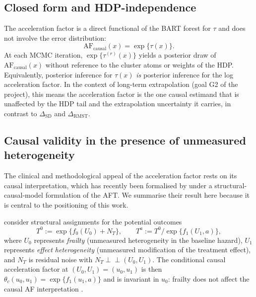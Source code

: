 \documentclass[11pt]{article}
\theoremstyle{plain}
\theoremstyle{definition}
\theoremstyle{remark}
\newcommand{\1}{\mathds{1}}
\newcommand{\tauf}{\tau}
\newcommand{\RMST}{\mathrm{RMST}}
\newcommand{\SD}{\mathrm{SD}}
\newcommand{\AF}{\mathrm{AF}}
\begin{document}
\subsection{Closed form and HDP-independence}

The acceleration factor is a direct functional of the BART forest for
$\tauf$ and does not involve the error distribution:
\begin{equation}
  \boxed{\;\AF_{\mathrm{causal}}(x) = \exp\{\tauf(x)\}.\;}
\end{equation}
At each MCMC iteration, $\exp\{\tauf^{(r)}(x)\}$ yields a posterior draw of
$\AF_{\mathrm{causal}}(x)$ without reference to the cluster atoms or
weights of the HDP. Equivalently, posterior inference for $\tauf(x)$
\emph{is} posterior inference for the log acceleration factor. In the
context of long-term extrapolation (goal G2 of the project), this means
the acceleration factor is the one causal estimand that is unaffected by
the HDP tail and the extrapolation uncertainty it carries, in contrast to
$\Delta_{\SD}$ and $\Delta_{\RMST}$.

\subsection{Causal validity in the presence of unmeasured heterogeneity}
\label{subsec:af-causal-validity}

The clinical and methodological appeal of the acceleration factor rests on
its causal interpretation, which has recently been formalised by
\citet{Brathovde2024} under a structural-causal-model formulation of the
AFT. We summarise their result here because it is central to the
positioning of this work.

\citet{Brathovde2024} consider structural assignments for the potential
outcomes
\begin{equation}
  T^{0} := \exp\{f_{0}(U_{0}) + N_{T}\}, \qquad
  T^{a} := T^{0}/\exp\{f_{1}(U_{1}, a)\},
  \label{eq:scm}
\end{equation}
where $U_{0}$ represents \emph{frailty} (unmeasured heterogeneity in the
baseline hazard), $U_{1}$ represents \emph{effect heterogeneity}
(unmeasured modification of the treatment effect), and $N_{T}$ is residual
noise with $N_{T} \perp\!\!\!\perp (U_{0}, U_{1})$. The conditional causal
acceleration factor at $(U_{0}, U_{1}) = (u_{0}, u_{1})$ is then
$\theta_{c}(u_{0}, u_{1}) = \exp\{f_{1}(u_{1}, a)\}$ and is invariant in
$u_{0}$: frailty does not affect the causal AF interpretation
\citep{Keiding1997, Aalen2015}.
\end{document}
